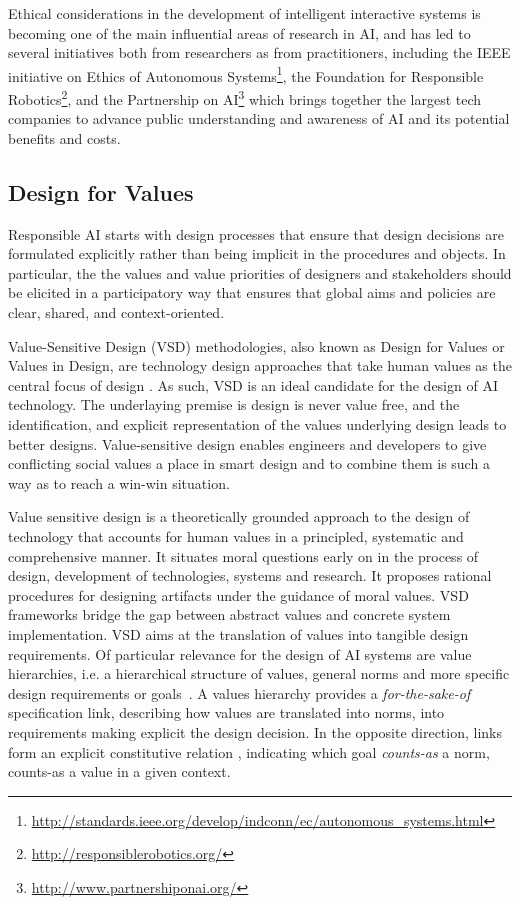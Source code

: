 \documentclass[twocolumn]{article}
\begin{document}
Ethical considerations in the development of intelligent interactive systems is becoming one of the main influential areas of research in AI, and has led to several initiatives both from researchers as from practitioners, including the IEEE initiative on Ethics of Autonomous Systems\footnote{\url{http://standards.ieee.org/develop/indconn/ec/autonomous_systems.html}}, the Foundation for Responsible Robotics\footnote{\url{http://responsiblerobotics.org/}}, 
and the Partnership on AI\footnote{\url{http://www.partnershiponai.org/}} which brings together the largest tech companies to advance public understanding and awareness of AI and its potential benefits and costs.

\subsection{Design for Values}\label{sec:vsd}
Responsible AI starts with design processes that ensure that design decisions are formulated explicitly rather than being implicit in the procedures and objects. In particular, the the values and value priorities of designers and stakeholders should be elicited in a participatory way that ensures that global aims and policies are clear, shared, and context-oriented.

Value-Sensitive Design (VSD) methodologies, also known as Design for Values or Values in Design, are technology design approaches that take human values as the central focus of design \cite{friedman2006,Hoven05}. As such, VSD is an ideal candidate for the design of AI technology. The underlaying premise is design is never value free, and the identification, and explicit representation of the values underlying design leads to better designs. Value-sensitive design enables engineers and developers to give conflicting social values a place in smart design and to combine them is such a way as to reach a win-win situation. 

Value sensitive design is a theoretically grounded approach to the design of technology that accounts for human values in a principled, systematic and comprehensive manner. It situates moral questions early on in the process of design, development of technologies, systems and research. It proposes rational procedures for designing artifacts under the guidance of moral values. 
VSD frameworks bridge the gap between abstract values and concrete system implementation. VSD aims at the translation of values into tangible design requirements. Of particular relevance for the design of AI systems are value hierarchies, i.e. a hierarchical structure of values, general norms and more specific design requirements or goals~\cite{vandePoel2013}. A values hierarchy provides a \textit{for-the-sake-of} specification link, describing how values are translated into norms, into requirements making explicit the design decision. In the opposite direction, links form an explicit constitutive relation \cite{searle2010making}, indicating which goal \textit{counts-as} a norm, counts-as a value in a given context. 
\end{document}
